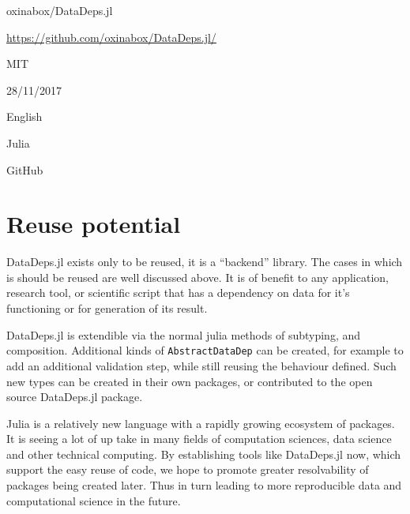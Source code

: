 \documentclass{book}
\begin{document}
\begin{description}[noitemsep,topsep=0pt]
	\item[Name:] oxinabox/DataDeps.jl
	\item[Persistent identifier:] \url{https://github.com/oxinabox/DataDeps.jl/}
	\item[Licence:] MIT
	\item[Date published:] 28/11/2017
	\item[Documentation Language] English
	\item[Programming Language] Julia
	\item[Code repository] GitHub
\end{description}


\section{Reuse potential}

DataDeps.jl exists only to be reused, it is a ``backend'' library.
The cases in which is should be reused are well discussed above.
It is of benefit to any application, research tool, or scientific script that has a dependency on data for it's functioning or for generation of its result.

DataDeps.jl is extendible via the normal julia methods of subtyping, and composition.
Additional kinds of \texttt{AbstractDataDep} can be created, for example to add an additional validation step, while still reusing the behaviour defined.
Such new types can be created in their own packages, or contributed to the open source DataDeps.jl package.


Julia is a relatively new language with a rapidly growing ecosystem of packages.
It is seeing a lot of up take in many fields of computation sciences, data science and other technical computing.
By establishing tools like DataDeps.jl now, which support the easy reuse of code,
we hope to promote greater resolvability of packages being created later.
Thus in turn leading to more reproducible data and computational science in the future.
\end{document}
